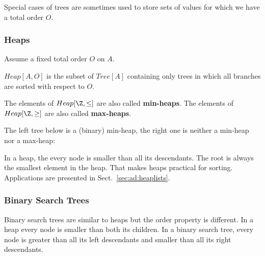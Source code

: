Special cases of trees are sometimes used to store sets of values for which we have a total order $O$.

\subsubsection{Heaps}\label{sec:ad:heaps}

Assume a fixed total order $O$ on $A$.

\begin{definition}[Heap]
$Heap[A,O]$ is the subset of $Tree[A]$ containing only trees in which all branches are sorted with respect to $O$.
\end{definition}

The elements of $Heap[\Z,\leq]$ are also called \textbf{min-heaps}.
The elements of $Heap[\Z,\geq]$ are also called \textbf{max-heaps}.

The left tree below is a (binary) min-heap, the right one is neither a min-heap nor a max-heap:

\begin{center}
\tb\tb
{}
\end{center}

In a heap, the every node is smaller than all its descendants.
The root is always the smallest element in the heap.
That makes heaps practical for sorting.
Applications are presented in Sect.~\ref{sec:ad:heaplists}.

\subsubsection{Binary Search Trees}

Binary search trees are similar to heaps but the order property is different.
In a heap every node is smaller than both its children.
In a binary search tree, every node is greater than all its left descendants and smaller than all its right descendants.

